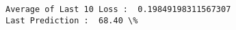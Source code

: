 \documentclass[11pt]{article}
\begin{document}
    \begin{Verbatim}[commandchars=\\\{\}]
Average of Last 10 Loss :  0.19849198311567307
Last Prediction :  68.40 \%

    \end{Verbatim}

    \begin{center}
    \end{center}
    { \hspace*{\fill} \\}
    

    
    
    
    
\end{document}
